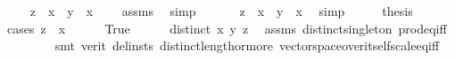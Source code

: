 \begin{isabellebody}
%
\isadelimproof
%
\endisadelimproof
%
\isatagproof
{}\isamarkupfalse%
{\isacharminus}{\kern0pt}\isanewline
\ \ \isamarkupfalse%
\ {\isachardoublequoteopen}{\isacharparenleft}{\kern0pt}z{}\ {\isacharminus}{\kern0pt}\ x{}{\isacharparenright}{\kern0pt}\ {\isacharasterisk}{\kern0pt}\ {\isacharparenleft}{\kern0pt}y{}\ {\isacharminus}{\kern0pt}\ x{}{\isacharparenright}{\kern0pt}\ {\isacharequal}{\kern0pt}\ {}{\isachardoublequoteclose}\ \isamarkupfalse%
\ assms\ \isamarkupfalse%
\ simp\isanewline
\ \ \isamarkupfalse%
\ \isamarkupfalse%
\ {}{\isacharcolon}{\kern0pt}\ {\isachardoublequoteopen}z{}\ {\isacharequal}{\kern0pt}\ x{}\ {\isasymor}\ y{}\ {\isacharequal}{\kern0pt}\ x{}{\isachardoublequoteclose}\ \isamarkupfalse%
\ simp\isanewline
\ \ \isamarkupfalse%
\ \isamarkupfalse%
\ {\isacharquery}{\kern0pt}thesis\isanewline
\ \ \isamarkupfalse%
{\isacharparenleft}{\kern0pt}cases\ {\isachardoublequoteopen}z{}\ {\isacharequal}{\kern0pt}\ x{}{\isachardoublequoteclose}{\isacharparenright}{\kern0pt}\isanewline
\ \ \ \ \isamarkupfalse%
\ True\isanewline
\ \ \ \ \isamarkupfalse%
\ {\isachardoublequoteopen}distinct\ {\isacharbrackleft}{\kern0pt}x{}{\isacharcomma}{\kern0pt}\ y{}{\isacharcomma}{\kern0pt}\ z{}{\isacharbrackright}{\kern0pt}{\isachardoublequoteclose}\ \isamarkupfalse%
\ assms\ distinct{\isacharunderscore}{\kern0pt}singleton\ prod{\isacharunderscore}{\kern0pt}eq{\isacharunderscore}{\kern0pt}iff\isanewline
\ \ \ \ \ \ \isamarkupfalse%
\ {\isacharparenleft}{\kern0pt}smt\ {\isacharparenleft}{\kern0pt}verit{\isacharcomma}{\kern0pt}\ del{\isacharunderscore}{\kern0pt}insts{\isacharparenright}{\kern0pt}\ distinct{\isacharunderscore}{\kern0pt}length{\isacharunderscore}{\kern0pt}{}{\isacharunderscore}{\kern0pt}or{\isacharunderscore}{\kern0pt}more\ vector{\isacharunderscore}{\kern0pt}space{\isacharunderscore}{\kern0pt}over{\isacharunderscore}{\kern0pt}itself{\isachardot}{\kern0pt}scale{\isacharunderscore}{\kern0pt}eq{\isacharunderscore}{\kern0pt}{}{\isacharunderscore}{\kern0pt}iff{\isacharparenright}{\kern0pt}\isanewline
\ \ \ \ \isamarkupfalse%
\ \isamarkupfalse%

\end{isabellebody}
